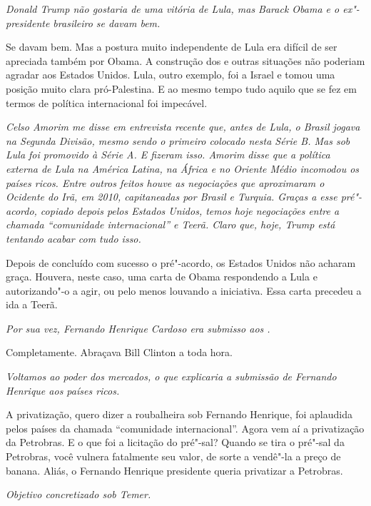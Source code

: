 \itshape
 Donald Trump não gostaria de uma vitória de Lula, mas
Barack Obama e o ex"-presidente brasileiro se davam bem.

\normalfont
Se davam bem. Mas a postura muito independente de Lula
era difícil de ser apreciada também por Obama. A construção dos  e
outras situações não poderiam agradar aos Estados Unidos. Lula, outro
exemplo, foi a Israel e tomou uma posição muito clara pró-Palestina. E
ao mesmo tempo tudo aquilo que se fez em termos de política
internacional foi impecável.

\itshape
 Celso Amorim me disse em entrevista recente que, antes
de Lula, o Brasil jogava na Segunda Divisão, mesmo sendo o primeiro
colocado nesta Série B. Mas sob Lula foi promovido à Série A. E fizeram
isso. Amorim disse que a política externa de Lula na América Latina, na
África e no Oriente Médio incomodou os países ricos. Entre outros feitos
houve as negociações que aproximaram o Ocidente do Irã, em 2010,
capitaneadas por Brasil e Turquia. Graças a esse pré"-acordo, copiado
depois pelos Estados Unidos, temos hoje negociações entre a chamada
``comunidade internacional'' e Teerã. Claro que, hoje, Trump está
tentando acabar com tudo isso.

\normalfont
Depois de concluído com sucesso o pré"-acordo, os Estados
Unidos não acharam graça. Houvera, neste caso, uma carta de Obama
respondendo a Lula e autorizando"-o a agir, ou pelo menos louvando a
iniciativa. Essa carta precedeu a ida a Teerã.

\itshape
 Por sua vez, Fernando Henrique Cardoso era submisso aos
.

\normalfont
Completamente. Abraçava Bill Clinton a toda hora.

\itshape
 Voltamos ao poder dos mercados, o que explicaria a
submissão de Fernando Henrique aos países ricos.

\normalfont
A privatização, quero dizer a roubalheira sob Fernando
Henrique, foi aplaudida pelos países da chamada ``comunidade
internacional''. Agora vem aí a privatização da Petrobras. E o que foi a
licitação do pré"-sal? Quando se tira o pré"-sal da Petrobras, você
vulnera fatalmente seu valor, de sorte a vendê"-la a preço de banana.
Aliás, o Fernando Henrique presidente queria privatizar a Petrobras.

\itshape
 Objetivo concretizado sob Temer.

